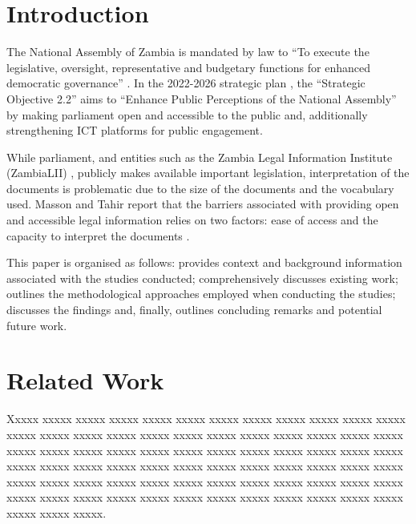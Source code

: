 \documentclass[conference]{IEEEtran}
\begin{document}
\section{Introduction}
\label{sec:introduction}
The National Assembly of Zambia is mandated by law to “To execute the legislative, oversight, representative and budgetary functions for enhanced democratic governance” \cite{NationalAssembly2023Objectives}. In the 2022-2026 strategic plan \cite{NationalAssembly2021Strategic}, the “Strategic Objective 2.2” aims to “Enhance Public Perceptions of the National Assembly” by making parliament open and accessible to the public and, additionally strengthening ICT platforms for public engagement.

While parliament, and entities such as the Zambia Legal Information Institute (ZambiaLII) \cite{ZambiaLII2024Website}, publicly makes available important legislation, interpretation of the documents is problematic due to the size of the documents and the vocabulary used. Masson and Tahir report that the barriers associated with providing open and accessible legal information relies on two factors: ease of access and the capacity to interpret the documents \cite{Masson2016Legal}.

This paper is organised as follows:  provides context and background information associated with the studies conducted;  comprehensively discusses existing work;  outlines the methodological approaches employed when conducting the studies;  discusses the findings and, finally,  outlines concluding remarks and potential future work.

\section{Related Work}
\label{sec:related_work}
Xxxxx xxxxx xxxxx  xxxxx  xxxxx  xxxxx  xxxxx  xxxxx  xxxxx  xxxxx  xxxxx  xxxxx  xxxxx  xxxxx  xxxxx  xxxxx  xxxxx  xxxxx  xxxxx  xxxxx  xxxxx  xxxxx  xxxxx  xxxxx  xxxxx  xxxxx  xxxxx  xxxxx  xxxxx  xxxxx  xxxxx  xxxxx  xxxxx  xxxxx  xxxxx  xxxxx  xxxxx  xxxxx  xxxxx  xxxxx  xxxxx  xxxxx  xxxxx  xxxxx  xxxxx  xxxxx  xxxxx  xxxxx  xxxxx  xxxxx  xxxxx  xxxxx  xxxxx  xxxxx  xxxxx  xxxxx  xxxxx  xxxxx  xxxxx  xxxxx  xxxxx  xxxxx  xxxxx  xxxxx  xxxxx  xxxxx  xxxxx  xxxxx  xxxxx  xxxxx  xxxxx  xxxxx  xxxxx  xxxxx  xxxxx.
\end{document}
